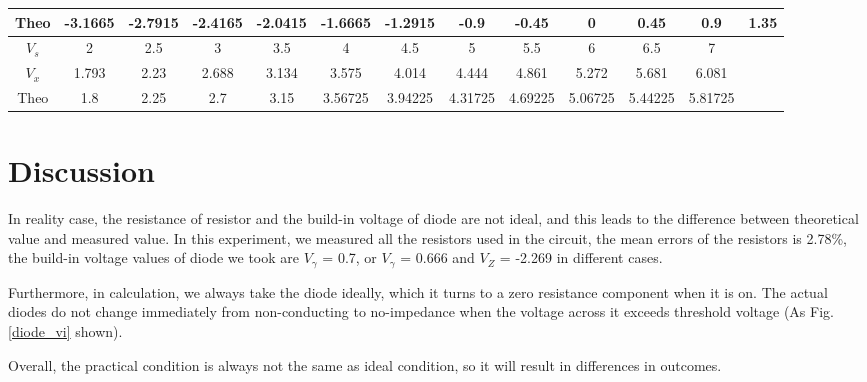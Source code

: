 \begin{itemize}
\begin{table}[h]
{\begin{tabular}{|c|c|c|c|c|c|c|c|c|c|c|c|c|}
                Theo  & -3.1665 & -2.7915 & -2.4165 & -2.0415 & -1.6665 & -1.2915 & -0.9    & -0.45   & 0       & 0.45    & 0.9     & 1.35 \\ \hline
                $V_s$ & 2       & 2.5     & 3       & 3.5     & 4       & 4.5     & 5       & 5.5     & 6       & 6.5     & 7       &      \\ \hline
                $V_x$ & 1.793   & 2.23    & 2.688   & 3.134   & 3.575   & 4.014   & 4.444   & 4.861   & 5.272   & 5.681   & 6.081   &      \\ \hline
                Theo  & 1.8     & 2.25    & 2.7     & 3.15    & 3.56725 & 3.94225 & 4.31725 & 4.69225 & 5.06725 & 5.44225 & 5.81725 &      \\ \hline
            \end{tabular}
            }
            \end{table}
            \FloatBarrier
    \end{itemize}
    

\section{Discussion}
    In reality case, the resistance of resistor and the build-in voltage of diode are not ideal, and this leads to the difference between theoretical value and measured value. In this experiment, we measured all the resistors used in the circuit, the mean errors of the resistors is 2.78\%, the build-in voltage values of diode we took are $V_\gamma$ = 0.7, or $V_\gamma$ = 0.666 and $V_Z$ = -2.269 in different cases.\par
    Furthermore, in calculation, we always take the diode ideally, which it turns to a zero resistance component when it is on. The actual diodes do not change immediately from non-conducting to no-impedance when the voltage across it exceeds threshold voltage (As Fig.\ref{diode_vi} shown).\par
    Overall, the practical condition is always not the same as ideal condition, so it will result in differences in outcomes.

